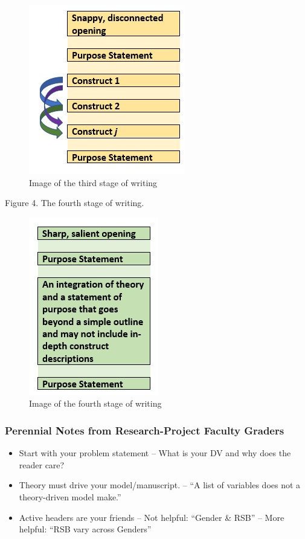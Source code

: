 \documentclass[
  11pt,
]{book}
\providecommand{\tightlist}{%
  \setlength{\itemsep}{0pt}\setlength{\parskip}{0pt}}
\begin{document}
\begin{figure}
\centering
\includegraphics{images/APAstyle/Stage3.jpg}
\caption{Image of the third stage of writing}
\end{figure}

Figure 4. The fourth stage of writing.

\begin{figure}
\centering
\includegraphics{images/APAstyle/Stage4.jpg}
\caption{Image of the fourth stage of writing}
\end{figure}

\hypertarget{perennial-notes-from-research-project-faculty-graders}{%
\subsubsection{Perennial Notes from Research-Project Faculty Graders}\label{perennial-notes-from-research-project-faculty-graders}}

\begin{itemize}
\tightlist
\item
  Start with your problem statement
  -- What is your DV and why does the reader care?
\item
  Theory must drive your model/manuscript.
  -- ``A list of variables does not a theory-driven model make.''
\item
  Active headers are your friends
  -- Not helpful: ``Gender \& RSB''
  -- More helpful: ``RSB vary across Genders''
\end{itemize}
\end{document}
